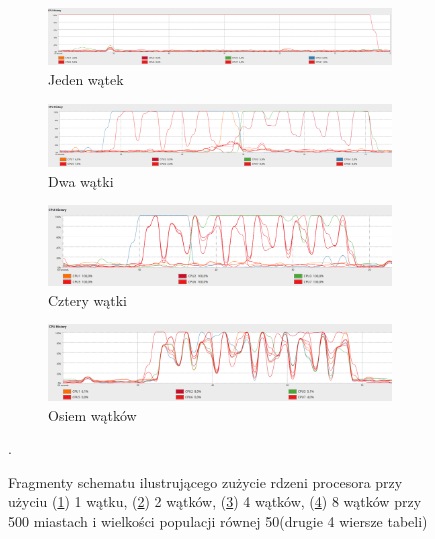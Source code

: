 \documentclass[10pt,a4paper]{article}
\begin{document}
\begin{figure}[H]
    \centering
    \begin{subfigure}[b]{\textwidth}
        \includegraphics[width=\textwidth]{31-1.png}
        \caption{Jeden wątek}
        \label{fig:31-1}
    \end{subfigure}
    
    \begin{subfigure}[b]{\textwidth}
        \includegraphics[width=\textwidth]{31-2.png}
        \caption{Dwa wątki}
        \label{fig:31-2}
    \end{subfigure}
    
    \begin{subfigure}[b]{\textwidth}
        \includegraphics[width=\textwidth]{31-4.png}
        \caption{Cztery wątki}
        \label{fig:31-4}
    \end{subfigure}
    
    \begin{subfigure}[b]{\textwidth}
            \includegraphics[width=\textwidth]{31-8.png}
            \caption{Osiem wątków}
            \label{fig:31-8}
    \end{subfigure}
    \caption{Fragmenty schematu ilustrującego zużycie rdzeni procesora przy użyciu (\ref{fig:31-1}) 1 wątku, (\ref{fig:31-2}) 2 wątków, (\ref{fig:31-4}) 4 wątków, (\ref{fig:31-8}) 8 wątków przy 500 miastach i wielkości populacji równej 50(drugie 4 wiersze tabeli)}\label{fig:31}. 
\end{figure}
\end{document}
